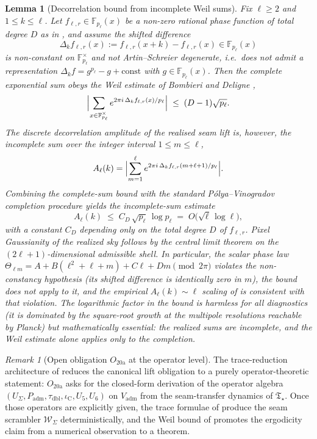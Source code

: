 \documentclass[11pt,a4paper]{article}
\newtheorem{lemma}[theorem]{Lemma}
\theoremstyle{definition}
\theoremstyle{remark}
\newtheorem*{remark}{Remark}
\newcommand{\taudbl}{\tau_{\mathrm{dbl}}}
\newcommand{\iC}{\iota_{\mathrm C}}
\newcommand{\Padm}{P_{\mathrm{adm}}}
\newcommand{\Tstar}{\mathfrak T_{\star}}
\begin{document}
\begin{lemma}[Decorrelation bound from incomplete Weil sums]
\label{lem:decorrelation-weil-bound}
Fix $\ell\ge2$ and $1\le k\le\ell$. Let $f_{\ell,r}\in\mathbb F_{p_\ell}(x)$ be a non-zero rational
phase function of total degree $D$ as in , and assume the shifted
difference
\[
\Delta_k f_{\ell,r}(x):=f_{\ell,r}(x+k)-f_{\ell,r}(x)\in\mathbb F_{p_\ell}(x)
\]
is non-constant on $\mathbb F_{p_\ell}^\times$ and not Artin--Schreier degenerate, i.e.\ does not
admit a representation $\Delta_k f=g^{p_\ell}-g+\mathrm{const}$ with
$g\in\mathbb F_{p_\ell}(x)$. Then the \emph{complete} exponential sum obeys the Weil estimate of
Bombieri \cite{Bombieri1966} and Deligne \cite{DeligneWeil},
\[
\Bigl|\sum_{x\in\mathbb F_{p_\ell}^\times}
e^{2\pi i\,\Delta_k f_{\ell,r}(x)/p_\ell}\Bigr|
\;\le\;(D-1)\sqrt{p_\ell}.
\]
The discrete decorrelation amplitude of the realised seam lift is, however, the
\emph{incomplete} sum over the integer interval $1\le m\le\ell$,
\[
A_\ell(k)
=\Bigl|\sum_{m=1}^{\ell}
e^{2\pi i\,\Delta_k f_{\ell,r}(m+\ell+1)/p_\ell}\Bigr|.
\]
Combining the complete-sum bound with the standard P\'olya--Vinogradov
\cite{PolyaVinogradov} completion procedure yields the incomplete-sum estimate
\[
A_\ell(k)\;\le\;C_D\,\sqrt{p_\ell}\,\log p_\ell
\;=\;O\!\bigl(\sqrt{\ell}\,\log\ell\bigr),
\]
with a constant $C_D$ depending only on the total degree $D$ of $f_{\ell,r}$. Pixel Gaussianity of
the realized sky follows by the central limit theorem on the $(2\ell+1)$-dimensional admissible
shell. In particular, the scalar phase law
$\Theta_{\ell m}=A+B(\ell^2+\ell+m)+C\ell+Dm\pmod{2\pi}$ violates the non-constancy hypothesis
(its shifted difference is identically zero in $m$), the bound does not apply to it, and the
empirical $A_\ell(k)\sim\ell$ scaling of  is consistent with that
violation. The logarithmic factor in the bound is harmless for all
diagnostics (it is dominated by the
square-root growth at the multipole resolutions reachable by Planck) but mathematically essential:
the realized sums are incomplete, and the Weil estimate alone applies only to the completion.
\end{lemma}

\begin{remark}[Open obligation $O_{20\mathrm{a}}$ at the operator level]
\label{rem:o20a-operator-level}
The trace-reduction architecture of  reduces the canonical lift
obligation to a purely operator-theoretic statement: $O_{20\mathrm{a}}$ asks for the closed-form
derivation of the operator algebra $(U_\Sigma,\Padm,\taudbl,\iC,U_5,U_6)$ on $V_{\mathrm{adm}}$
from the seam-transfer dynamics of $\Tstar$. Once those operators are explicitly given, the trace
formulae of  produce the seam scrambler $\mathcal W_\Sigma$
deterministically, and the Weil bound of  promotes the
ergodicity claim from a numerical observation to a theorem.
\end{remark}
\end{document}
